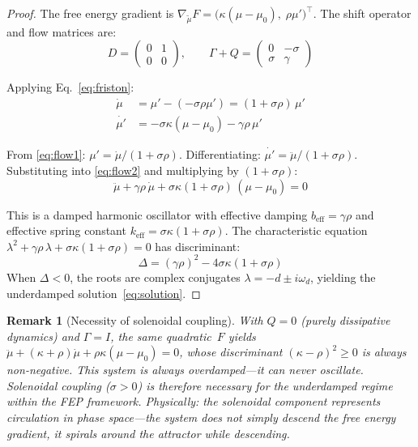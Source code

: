 \documentclass[11pt,a4paper]{article}
\newtheorem{remark}[theorem]{Remark}
\begin{document}
\begin{proof}
The free energy gradient is
$\nabla_{\tilde{\mu}} F = \bigl(\kappa(\mu-\mu_0),\;\rho\mu'\bigr)^\top$.
The shift operator and flow matrices are:
\[
D = \begin{pmatrix} 0 & 1 \\ 0 & 0 \end{pmatrix}, \qquad
\Gamma + Q = \begin{pmatrix} 0 & -\sigma \\ \sigma & \gamma \end{pmatrix}
\]

Applying Eq.~\eqref{eq:friston}:
\begin{align}
\dot{\mu}  &= \mu' - (-\sigma\rho\mu')
            = (1 + \sigma\rho)\,\mu'
            \label{eq:flow1} \\
\dot{\mu'} &= -\sigma\kappa(\mu - \mu_0) - \gamma\rho\,\mu'
            \label{eq:flow2}
\end{align}

From \eqref{eq:flow1}: $\mu' = \dot{\mu}/(1+\sigma\rho)$.
Differentiating: $\dot{\mu'} = \ddot{\mu}/(1+\sigma\rho)$.
Substituting into \eqref{eq:flow2} and multiplying by $(1+\sigma\rho)$:
\begin{equation}
\ddot{\mu} + \gamma\rho\,\dot{\mu}
  + \sigma\kappa(1+\sigma\rho)\,(\mu - \mu_0) = 0
\end{equation}

This is a damped harmonic oscillator with effective damping
$b_{\mathrm{eff}} = \gamma\rho$ and effective spring constant
$k_{\mathrm{eff}} = \sigma\kappa(1+\sigma\rho)$. The characteristic
equation $\lambda^2 + \gamma\rho\,\lambda + \sigma\kappa(1+\sigma\rho) = 0$
has discriminant:
\begin{equation}
\Delta = (\gamma\rho)^2 - 4\sigma\kappa(1+\sigma\rho)
\end{equation}
When $\Delta < 0$, the roots are complex conjugates
$\lambda = -d \pm i\omega_d$, yielding the underdamped
solution~\eqref{eq:solution}.
\end{proof}

\begin{remark}[Necessity of solenoidal coupling]
\label{rem:solenoidal}
With $Q = 0$ (purely dissipative dynamics) and $\Gamma = I$, the same
quadratic~$F$ yields
$\ddot{\mu} + (\kappa + \rho)\dot{\mu} + \rho\kappa(\mu - \mu_0) = 0$,
whose discriminant $(\kappa-\rho)^2 \geq 0$ is always non-negative.
This system is \emph{always} overdamped---it can never oscillate.
Solenoidal coupling ($\sigma > 0$) is therefore necessary for the
underdamped regime within the FEP framework.
Physically: the solenoidal component represents circulation in phase
space---the system does not simply descend the free energy gradient, it
\emph{spirals} around the attractor while descending.
\end{remark}
\end{document}
